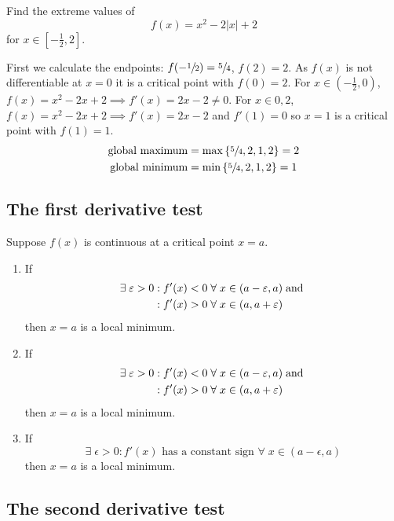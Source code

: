 \begin{example}
    Find the extreme values of \[f(x)=x^2-2|x|+2\] for $x\in[-\frac12,2]$.
    
    First we calculate the endpoints: $f(-\sfrac12)=\sfrac54$, $f(2)=2$. As $f(x)$ is not differentiable at $x=0$ it is a critical point with $f(0)=2$. For $x\in(-\frac12,0)$, $f(x)=x^2-2x+2\implies f'(x)=2x-2\neq0$. For $x\in{0,2}$, $f(x)=x^2-2x+2\implies f'(x)=2x-2$ and $f'(1)=0$ so $x=1$ is a critical point with $f(1)=1$.
    \begin{align*}
        \text{global maximum}&=\max{\{\sfrac54,2,1,2\}}=2\\
        \text{global minimum}&=\min{\{\sfrac54,2,1,2\}}=1
    \end{align*}
\end{example}

\subsection{The first derivative test}

Suppose $f(x)$ is continuous at a critical point $x=a$.

\begin{enumerate}
    \item If
    \begin{align*}
        \exists\;\varepsilon>0&:f'(x)<0\;\forall\;x\in(a-\varepsilon,a)\;\text{and}\;\\
        &:f'(x)>0\;\forall\;x\in(a,a+\varepsilon)
    \end{align*}
    then $x=a$ is a local minimum.
    
    \item If
    \begin{align*}
        \exists\;\varepsilon>0&:f'(x)<0\;\forall\;x\in(a-\varepsilon,a)\;\text{and}\;\\
        &:f'(x)>0\;\forall\;x\in(a,a+\varepsilon)
    \end{align*}
    then $x=a$ is a local minimum.
    
    \item If
    \[\exists\;\epsilon>0:f'(x)\text{ has a constant sign }\forall\;x\in(a-\epsilon,a)\]
    then $x=a$ is a local minimum.
\end{enumerate}

\subsection{The second derivative test}


